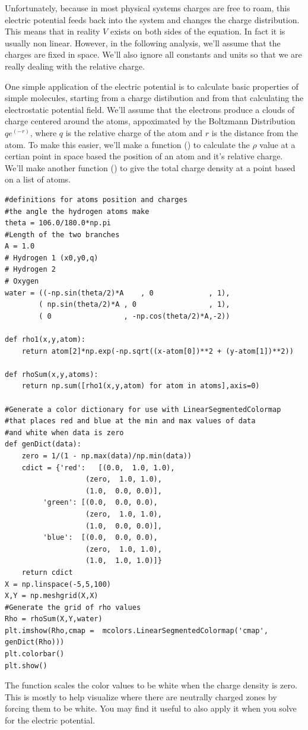 Unfortunately, because in most physical systems charges are free to roam, this electric potential feeds back into the system and changes the charge distribution. 
This means that in reality $V$ exists on both sides of the equation.
In fact it is usually non linear. 
However, in the following analysis, we'll assume that the charges are fixed in space.
We'll also ignore all constants and units so that we are really dealing with the relative charge.

One simple application of the electric potential is to calculate basic properties of simple molecules, starting from a charge distibution and from that calculating the electrostatic potential field.
We'll assume that the electrons produce a clouds of charge centered around the atoms, appoximated by  the Boltzmann Distribution $q e^(-r)$, where $q$ is the relative charge of the atom and $r$ is the distance from the atom. 
To make this easier, we'll make a function () to calculate the $\rho$ value  at a certian point in space based the position of an atom and it's relative charge. 
We'll make another function () to give the total charge density at a point based on a list of atoms.

\begin{lstlisting}
#definitions for atoms position and charges
#the angle the hydrogen atoms make
theta = 106.0/180.0*np.pi
#Length of the two branches
A = 1.0
# Hydrogen 1 (x0,y0,q)
# Hydrogen 2 
# Oxygen
water = ((-np.sin(theta/2)*A	, 0				, 1),
        ( np.sin(theta/2)*A	, 0				 	, 1),
        ( 0					, -np.cos(theta/2)*A,-2))

def rho1(x,y,atom):
    return atom[2]*np.exp(-np.sqrt((x-atom[0])**2 + (y-atom[1])**2))

def rhoSum(x,y,atoms):
    return np.sum([rho1(x,y,atom) for atom in atoms],axis=0)

#Generate a color dictionary for use with LinearSegmentedColormap
#that places red and blue at the min and max values of data
#and white when data is zero
def genDict(data):
    zero = 1/(1 - np.max(data)/np.min(data))
    cdict = {'red':   [(0.0,  1.0, 1.0),
                   (zero,  1.0, 1.0),
                   (1.0,  0.0, 0.0)],
         'green': [(0.0,  0.0, 0.0),
                   (zero,  1.0, 1.0),
                   (1.0,  0.0, 0.0)],
         'blue':  [(0.0,  0.0, 0.0),
                   (zero,  1.0, 1.0),
                   (1.0,  1.0, 1.0)]}
    return cdict
X = np.linspace(-5,5,100)
X,Y = np.meshgrid(X,X)
#Generate the grid of rho values
Rho = rhoSum(X,Y,water)
plt.imshow(Rho,cmap =  mcolors.LinearSegmentedColormap('cmap', genDict(Rho)))
plt.colorbar()
plt.show()
\end{lstlisting}
The function  scales the color values to be white when the charge density is zero. This is mostly to help visualize where there are neutrally charged zones by forcing them to be white. You may find it useful to also apply it when you solve for the electric potential.

